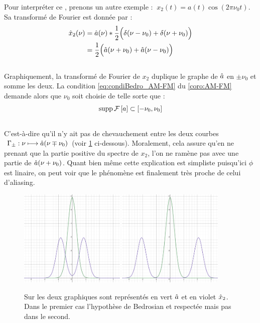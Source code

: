 Pour interpréter ce , prenons un autre exemple : $\ x_2(t) = a(t)\cos(2\pi \nu_0 t)$. Sa transformé de Fourier est donnée par :
\begin{align*}
	\hat{x}_2(\nu) &= \hat{a}(\nu)*\frac{1}{2}\Big(\delta(\nu-\nu_0) + \delta(\nu+\nu_0)\Big) \\
	&= \frac{1}{2}\Big(\hat{a}(\nu+\nu_0) + \hat{a}(\nu-\nu_0)\Big)
\end{align*}
\\
Graphiquement, la transformé de Fourier de $x_2$ duplique le graphe de $\hat{a}$ en $\pm\nu_0$ et somme les deux. La condition \eqref{eq:condiBedro_AM-FM} du \cref{coro:AM-FM} demande alors que $\nu_0$ soit choisie de telle sorte que :
\[\text{\normalfont supp}\, \mathcal{F}\left[a\right]\subset[-\nu_0, \nu_0]\]
\\
C'est-à-dire qu'il n'y ait pas de chevauchement entre les deux courbes $\ \Gamma_\pm : \nu \longmapsto \hat{a}(\nu\mp\nu_0) $ (voir \cref{fig:alising-ish} ci-dessous). Moralement, cela assure qu'en ne prenant que la partie positive du spectre de $x_2$, l'on ne ramène pas avec une partie de $\hat{a}(\nu+\nu_0)$. Quant bien même cette explication est simpliste puisqu'ici $\phi$ est linaire, on peut voir que le phénomène est finalement très proche de celui d'aliasing.
\\

\begin{figure}[h]\centering
	\includegraphics[width=0.45\textwidth]{fig/part-1/bedro condi 1.png} 
	\hfill
	\includegraphics[width=0.45\textwidth]{fig/part-1/bedro condi 2.png} 
	\caption[\DONE Représentation de l'hypothèse du Théorème de Bedrosian]{Sur les deux graphiques sont représentés en vert $\hat{a}$ et en violet $\hat{x}_2$. Dans le premier cas l'hypothèse de Bedrosian et respectée mais pas dans le second.}
	\label{fig:alising-ish}
\end{figure}


